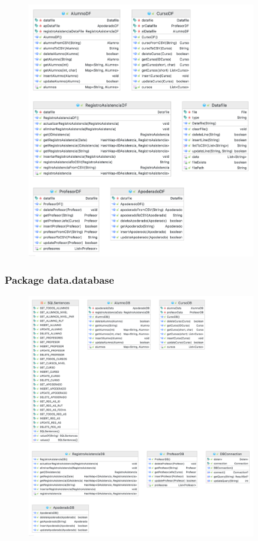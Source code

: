 \begin{figure}[h]
    \centering
    \includegraphics[width=0.9\textwidth]{contents/img/paq/data.datafile}
\end{figure}

\clearpage

\subsubsection*{Package data.database}

\begin{figure}[h]
    \centering
    \includegraphics[width=0.9\textwidth]{contents/img/paq/data.database}
\end{figure}

